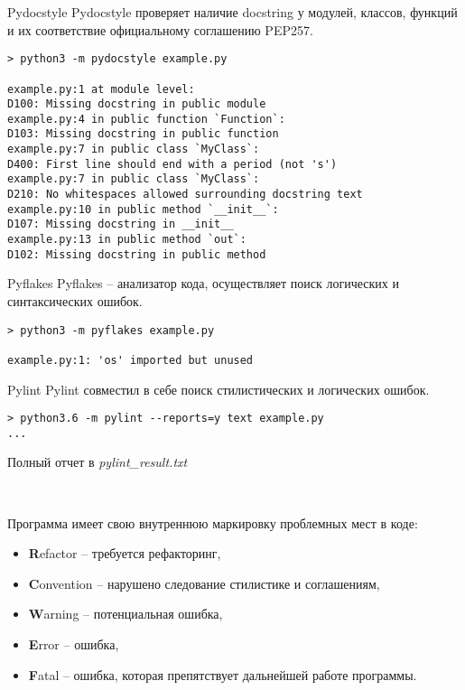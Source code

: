 \documentclass[xcolor=table]{beamer}
\begin{document}
\begin{frame}[fragile]{Pydocstyle}
	 Pydocstyle проверяет наличие docstring у модулей, классов, функций и их соответствие официальному соглашению PEP257. 
	\begin{verbatim}
> python3 -m pydocstyle example.py

example.py:1 at module level:
D100: Missing docstring in public module
example.py:4 in public function `Function`:
D103: Missing docstring in public function
example.py:7 in public class `MyClass`:
D400: First line should end with a period (not 's')
example.py:7 in public class `MyClass`:
D210: No whitespaces allowed surrounding docstring text
example.py:10 in public method `__init__`:
D107: Missing docstring in __init__
example.py:13 in public method `out`:
D102: Missing docstring in public method
	\end{verbatim}
\end{frame}

\begin{frame}[fragile]{Pyflakes}
	 Pyflakes -- анализатор кода, осуществляет поиск логических и синтаксических ошибок. 
	\begin{verbatim}
> python3 -m pyflakes example.py 

example.py:1: 'os' imported but unused
	\end{verbatim}
\end{frame}

\begin{frame}[fragile]{Pylint}
	 Pylint совместил в себе поиск стилистических и логических ошибок. 
	\begin{verbatim}
> python3.6 -m pylint --reports=y text example.py
...
	\end{verbatim}
	Полный отчет в \textit{pylint\_result.txt}

	~
	
	Программа имеет свою внутреннюю маркировку проблемных мест в коде:
	\begin{itemize}
		\item \textbf{R}efactor -- требуется рефакторинг,
		\item \textbf{C}onvention -- нарушено следование стилистике и соглашениям,
		\item \textbf{W}arning -- потенциальная ошибка,
		\item \textbf{E}rror -- ошибка,
		\item \textbf{F}atal -- ошибка, которая препятствует дальнейшей работе программы.	
	\end{itemize}
\end{frame}
\end{document}
